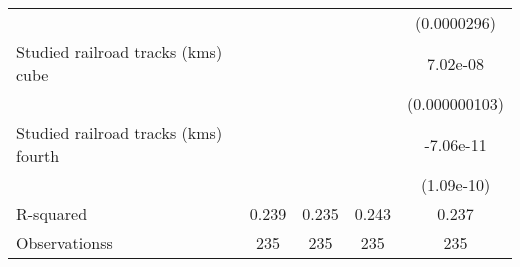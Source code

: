 {\begin{tabular}{l*{4}{c}}
                    &                     &                     &                     & (0.0000296)         \\
[1em]
Studied railroad tracks (kms) cube&                     &                     &                     &    7.02e-08         \\
                    &                     &                     &                     &(0.000000103)         \\
[1em]
Studied railroad tracks (kms) fourth&                     &                     &                     &   -7.06e-11         \\
                    &                     &                     &                     &  (1.09e-10)         \\
\hline
R-squared           &       0.239         &       0.235         &       0.243         &       0.237         \\
Observationss       &         235         &         235         &         235         &         235         \\
\hline\hline
\end{tabular}
}
